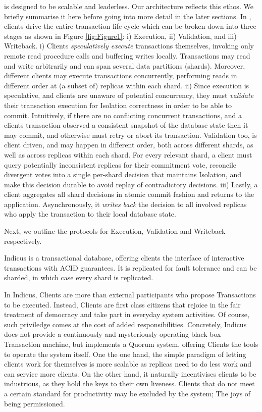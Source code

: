 \sys is designed to be scalable and leaderless. Our architecture reflects this ethos. We briefly summarise it here before going into more detail in the later sections. 
In \sys, clients drive the entire transaction life cycle which can be broken down into three stages as shown in Figure \ref{fig:Figure1}: i) Execution, ii) Validation, and iii) Writeback. 
i) Clients \textit{speculatively execute} transactions themselves, invoking only remote read procedure calls and buffering writes locally. Transactions may read and write arbitrarily and can span several data partitions (shards). Moreover, different clients may execute transactions concurrently, performing reads in different order at (a subset of) replicas within each shard. 
ii) Since execution is speculative, and clients are unaware of potential concurrency, they must \textit{validate} their transaction execution for Isolation correctness in order to be able to commit. Intuitively, if there are no conflicting concurrent transactions, and a clients transaction observed a consistent snapshot of the database state then it may commit, and otherwise must retry or abort its transaction. Validation too, is client driven, and may happen in different order, both across different shards, as well as across replicas within each shard. For every relevant shard, a client must query potentially inconsistent replicas for their commitment vote, reconcile divergent votes into a single per-shard decision that maintains Isolation, and make this decision durable to avoid replay of contradictory decisions. 
iii) Lastly, a client aggregates all shard decisions in atomic commit fashion and returns to the application. Asynchronously, it \textit{writes back} the decision to all involved replicas who apply the transaction to their local database state.

Next, we outline the protocols for Execution, Validation and Writeback respectively. 

Indicus is a transactional database, offering clients the interface of interactive transactions with ACID guarantees. It is replicated for fault tolerance and can be sharded, in which case every shard is replicated. 

In Indicus, Clients are more than external participants who propose Transactions to be executed. Instead, Clients are first class citizens that rejoice in the fair treatment of democracy and take part in everyday system activities. Of course, such priviledge comes at the cost of added responsibilities. Concretely, Indicus does not provide a continuously and mysteriously operating black box Transaction machine, but implements a Quorum system, offering Clients the tools to operate the system itself. One the one hand, the simple paradigm of letting clients work for themselves is more scalable as replicas need to do less work and can service more clients. On the other hand, it naturally incentivises clients to be industrious, as they hold the keys to their own liveness. Clients that do not meet a certain standard for productivity may be excluded by the system; The joys of being permissioned.

